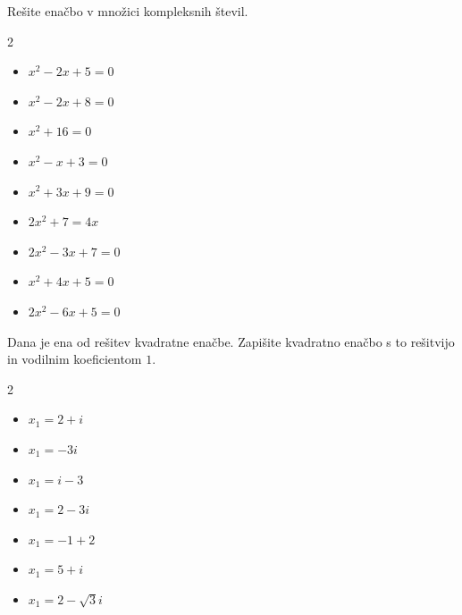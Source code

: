             \begin{naloga}
                Rešite enačbo v množici kompleksnih števil.

                \begin{multicols}{2}
                    
                \begin{itemize}
                        \item $ x^2-2x+5=0 $ 
                        \item $ x^2-2x+8=0 $ 
                        \item $ x^2+16=0 $ 
                        \item $ x^2-x+3=0 $ 
                        \item $ x^2+3x+9=0 $ 
                        \item $ 2x^2+7=4x $ 
                        \item $ 2x^2-3x+7=0 $ 
                        \item $ x^2+4x+5=0 $ 
                        \item $ 2x^2-6x+5=0 $ 
                    \end{itemize}
                \end{multicols}
            \end{naloga}

        
            \begin{naloga}
                Dana je ena od rešitev kvadratne enačbe. Zapišite kvadratno enačbo s to rešitvijo in vodilnim koeficientom $1$.

                \begin{multicols}{2}
                    
                    \begin{itemize}
                        \item $ x_1=2+i $ 
                        \item $ x_1=-3i $ 
                        \item $ x_1=i-3 $ 
                        \item $ x_1=2-3i $ 
                        \item $ x_1=-1+2 $ 
                        \item $ x_1=5+i $ 
                        \item $ x_1=2-\sqrt{3}i $ 
                    \end{itemize}
                \end{multicols}
                \end{naloga}

